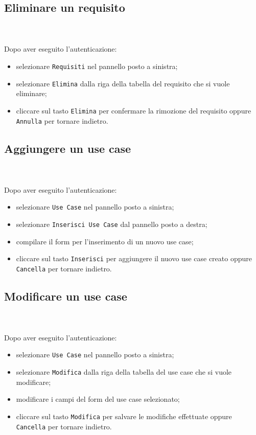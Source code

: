 	\subsection{Eliminare un requisito} \mbox{}\\ \mbox{}\\
	Dopo aver eseguito l'autenticazione:
	\begin{itemize}
		\item selezionare \texttt{Requisiti} nel pannello posto a sinistra;
		\item selezionare \texttt{Elimina} dalla riga della tabella del 
		requisito 
		che si vuole eliminare;\
		\item cliccare sul tasto \texttt{Elimina} per confermare la rimozione 
		del requisito
		oppure \texttt{Annulla} per tornare indietro.
	\end{itemize}
	
	\subsection{Aggiungere un use case} \mbox{}\\ \mbox{}\\
	Dopo aver eseguito l'autenticazione:
	\begin{itemize}
		\item selezionare \texttt{Use Case} nel pannello posto a sinistra;
		\item selezionare \texttt{Inserisci Use Case} dal pannello posto a 
		destra;
		\item compilare il form per l'inserimento di un nuovo use case;
		\item cliccare sul tasto \texttt{Inserisci} per aggiungere il nuovo use 
		case
		creato oppure \texttt{Cancella} per tornare indietro.	
	\end{itemize}
	
	\subsection{Modificare un use case} \mbox{}\\ \mbox{}\\
	Dopo aver eseguito l'autenticazione:
	\begin{itemize}
		\item selezionare \texttt{Use Case} nel pannello posto a sinistra;
		\item selezionare \texttt{Modifica} dalla riga della tabella del use 
		case
		che si vuole modificare;
		\item modificare i campi del form del use case selezionato;
		\item cliccare sul tasto \texttt{Modifica} per salvare le modifiche 
		effettuate
		oppure \texttt{Cancella} per tornare indietro.
	\end{itemize}
	
